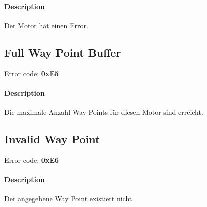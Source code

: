 \documentclass[10pt,a4paper]{article}
\begin{document}
\paragraph*{Description\\}
Der Motor hat einen Error.

\subsection{Full Way Point Buffer}

Error code: \textbf{0xE5}
\paragraph*{Description\\}
Die maximale Anzahl Way Points für diesen Motor sind erreicht.

\subsection{Invalid Way Point}

Error code: \textbf{0xE6}
\paragraph*{Description\\}
Der angegebene Way Point existiert nicht.
\end{document}
